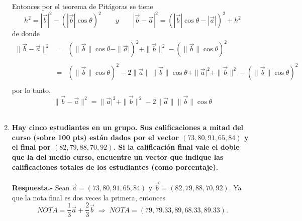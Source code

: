 \begin{enumerate}
    Entonces por el teorema de Pitágoras se tiene $$h^2=|\vec{b}|^2 - \left(|\vec{b}|\cos \theta\right)^2 \qquad y \qquad |\vec{b}-\vec{a}|^2 = \left(|\vec{b}|\cos \theta - |\vec{a}|\right)^2+h^2$$
    de donde 
    $$\begin{array}{rcl}
	\|\vec{b}-\vec{a}\|^2 &=& \left(\|\vec{b}\|\cos \theta - \|\vec{a}|\right)^2+\|\vec{b}\|^2 - \left(\|\vec{b}\|\cos \theta\right)^2\\\\
			      &=& \left(\|\vec{b}\|\cos \theta\right)^2 - 2\|\vec{a}\|\|\vec{b}\|\cos \theta + \|\vec{a}|^2 + \|\vec{b}\|^2 - \left(\|\vec{b}\|\cos \theta\right)^2\\
    \end{array}$$
    por lo tanto, 
    $$\|\vec{b}-\vec{a}\|^2 = \|\vec{a}|^2 + \|\vec{b}\|^2 - 2\|\vec{a}\|\|\vec{b}\|\cos \theta $$\\

\item \textbf{\boldmath Hay cinco estudiantes en un grupo. Sus calificaciones a mitad del curso (sobre 100 pts) están dados por el vector $(73, 80, 91, 65, 84)$ y el final por $(82, 79, 88, 70, 92)$. Si la calificación final vale el doble que la del medio curso, encuentre un vector que indique las calificaciones totales de los estudiantes (como porcentaje).\\\\
    Respuesta.-}\; Sean $\vec{a}=(73, 80, 91, 65, 84)$  y $\vec{b}=(82, 79, 88, 70, 92)$. Ya que la nota final es dos veces la primera, entonces
    $$NOTA = \dfrac{1}{3}\vec{a}+\dfrac{2}{3}\vec{b} \; \Rightarrow \; NOTA=(79, 79.33, 89, 68.33, 89.33).$$\\

\end{enumerate}


